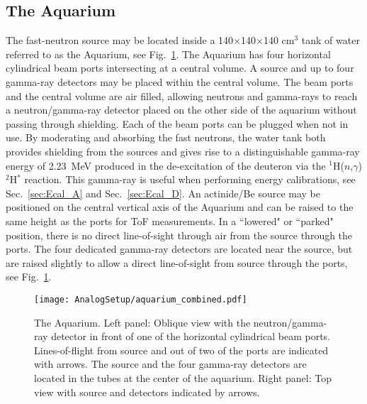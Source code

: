\documentclass[main.tex]{subfiles}
\begin{document}
\subsection{The Aquarium}
The fast-neutron source may be located inside a 140$\times$140$\times$140 \si{\cm}${}^\text{3}$ tank of water referred to as the Aquarium, see Fig.~\ref{fig:aquarium}. The Aquarium has four horizontal cylindrical beam ports intersecting at a central volume. A source and up to four gamma-ray detectors may be placed within the central volume.  The beam ports and the central volume are air filled, allowing neutrons and gamma-rays to reach a neutron/gamma-ray detector placed on the other side of the aquarium without passing through shielding. Each of the beam ports can be plugged when not in use.
By moderating and absorbing the fast neutrons, the water tank both provides shielding from the sources and gives rise to a distinguishable gamma-ray energy of \SI{2.23}{MeV} produced in the de-excitation of the deuteron via the $^{\text{1}}$H($n$,$\gamma$)$^{\text{2}}$H$^*$ reaction. This gamma-ray is useful when performing energy calibrations, see Sec.~\ref{sec:Ecal_A} and Sec.~\ref{sec:Ecal_D}. 
An actinide/Be source may be positioned on the central vertical axis of the Aquarium and can be raised to the same height as the ports for ToF measurements. In a ``lowered" or ``parked" position, there is no direct line-of-sight through air from the source through the ports. The four dedicated gamma-ray detectors are located near the source, but are raised slightly to allow a direct line-of-sight from source through the ports, see Fig.~\ref{fig:aquarium}.
\begin{figure}[ht]
	\center
    	\texttt{[image: AnalogSetup/aquarium\_combined.pdf]}
	\caption[The Aquarium]{The Aquarium. Left panel: Oblique view with the neutron/gamma-ray detector in front of one of the horizontal cylindrical beam ports. Lines-of-flight from source and out of two of the ports are indicated with arrows. The source and the four gamma-ray detectors are located in the tubes at the center of the aquarium. Right panel: Top view with source and detectors indicated by arrows.}
	\label{fig:aquarium}
\end{figure}
\end{document}
